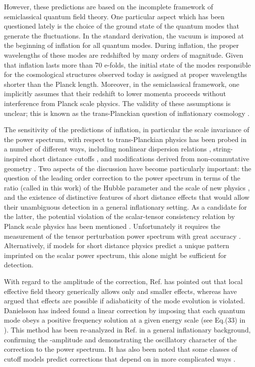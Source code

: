 \documentclass[a4paper,aps,prd,preprint,groupedaddress,nofootinbib]{revtex4}
\begin{document}
 
However, these predictions are based on the incomplete framework of
semiclassical quantum field theory.  One particular aspect which has
been questioned lately is the choice of the ground state of the
quantum modes that generate the fluctuations. In the standard
derivation, the vacuum is imposed at  the beginning of inflation for
all quantum modes. During inflation,  the proper wavelengths of
these modes are redshifted by many orders of magnitude.  Given that
inflation lasts more than 70 e-folds, the initial state of the modes
responsible for the cosmological structures  observed today is
assigned at proper wavelengths shorter than the Planck length.
Moreover, in the semiclassical framework, one implicitly assumes that
their redshift to lower  momenta proceeds without interference from
Planck scale physics.  The validity of these assumptions is unclear;
this is known as the trans-Planckian question of inflationary
cosmology \cite{J00}.

The sensitivity of the predictions of inflation, in particular the
scale invariance of the power spectrum, with respect to
trans-Planckian physics has been probed in a number of different ways,
including nonlinear dispersion relations
\cite{MB00,BM00,BJM01,N00,NP01,S02}, string-inspired short  distance
cutoffs \cite{K00,KN01,Eea01,Eea01b,HS02}, and modifications derived
from non-commutative geometry \cite{CGS00,Lea02b,BH02}. Two aspects of
the discussion have become particularly  important: the question of
the leading order correction to the power spectrum in terms of the
ratio (called \myHighlight{$\sigma$}\coordHE{} in this work) of the Hubble parameter \coordHE{} and
the scale of new physics \coordHE{}, and the existence of distinctive
features of short distance effects that would allow their unambiguous
detection in a general inflationary setting. As a candidate for the
latter, the potential violation of the scalar-tensor consistency
relation by Planck scale physics has been mentioned
\cite{HK01}. Unfortunately it requires the measurement of the tensor
perturbation power spectrum with great accuracy
\cite{Kea02}. Alternatively, if models for short distance physics
predict a unique pattern imprinted on the scalar power spectrum, this
alone might be sufficient for detection.

With regard to the amplitude of the correction, Ref.\cite{Kea02} has
pointed out that local  effective field theory generically allows only
\coordHE{} and smaller effects, whereas \cite{BM02} have argued that
\coordHE{} effects are possible if adiabaticity of the mode evolution
is violated.  Danielsson  \cite{D02} has indeed found a linear
correction by imposing  that each quantum mode obeys a
positive frequency solution at a given energy scale \coordHE{} (see Eq.(33)
in  \cite{Eea02}). This method has been re-analyzed in
Ref.\cite{Eea02} in a general inflationary background, confirming the
\coordHE{}-amplitude and demonstrating the oscillatory character of
the correction to the power spectrum. It has also been noted that some
classes of cutoff models predict corrections that depend on \coordHE{} in more
complicated ways \cite{SW02}. 
\end{document}
